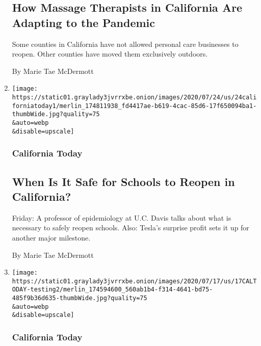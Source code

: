 \begin{enumerate}
{  \subsection{How Massage Therapists in California Are Adapting to the
  Pandemic}\label{how-massage-therapists-in-california-are-adapting-to-the-pandemic}}

  Some counties in California have not allowed personal care businesses
  to reopen. Other counties have moved them exclusively outdoors.

  By Marie Tae McDermott
\item
  \href{/2020/07/24/us/ca-schools-reopening.html}{}

  \texttt{[image: https://static01.graylady3jvrrxbe.onion/images/2020/07/24/us/24californiatoday1/merlin\_174811938\_fd4417ae-b619-4cac-85d6-17f650094ba1-thumbWide.jpg?quality=75\\\&auto=webp\\\&disable=upscale]}

  \hypertarget{california-today-6}{%
  \subsubsection{California Today}\label{california-today-6}}

  \hypertarget{when-is-it-safe-for-schools-to-reopen-in-california}{%
  \subsection{When Is It Safe for Schools to Reopen in
  California?}\label{when-is-it-safe-for-schools-to-reopen-in-california}}

  Friday: A professor of epidemiology at U.C. Davis talks about what is
  necessary to safely reopen schools. Also: Tesla's surprise profit sets
  it up for another major milestone.

  By Marie Tae McDermott
\item
  \href{/2020/07/17/us/ca-coronavirus-covid-testing.html}{}

  \texttt{[image: https://static01.graylady3jvrrxbe.onion/images/2020/07/17/us/17CALTODAY-testing2/merlin\_174594600\_560ab1b4-f314-4641-bd75-485f9b36d635-thumbWide.jpg?quality=75\\\&auto=webp\\\&disable=upscale]}

  \hypertarget{california-today-7}{%
  \subsubsection{California Today}\label{california-today-7}}

  \hypertarget{is-california-doing-enough-coronavirus-testing}{%
}
\end{enumerate}
